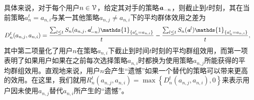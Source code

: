 具体来说，对于每个用户$n\in\mathcal{V}$，给定其对手的策略$\emph{\textbf{a}}_{-n}$，则截止到$t$时刻，其在当前策略$a^t_n=a_{n,i}$与某一其他策略$a_{n,j}\neq a_{n,i}$下的平均群体效用之差为
\begin{equation}\label{eq:reg1}
\small
D_n^t(a_{n,j},a_{n,i})=\frac{\sum_{l\leq t}S_n(a_{n,j},\A^l_{-n})\mathds{1}_{\{a^l_n=a_{n,i}\}}}{t}-\frac{\sum_{l\leq t}S_n(\A^l)\mathds{1}_{\{a^l_n=a_{n,i}\}}}{t},
\end{equation}
其中第二项量化了用户$n$在策略$a_{n,i}$下截止到时间$t$时刻的平均群组效用，而第一项表明了如果用户如果在之前每次选择策略$a_{n,i}$时都换为使用策略$a_{n,j}$所能获得的平均群组效用。直观地来说，用户$n$会产生“遗憾”如果一个替代的策略可以带来更高的效用。在这里，我们就用$R^t_n(a_{n,j},a_{n,i})=\max\left\{D^t_n(a_{n,j},a_{n,i}),0\right\}$来表示用户因未使用$a_{n,j}$替代$a_{n,i}$所产生的“遗憾”。

